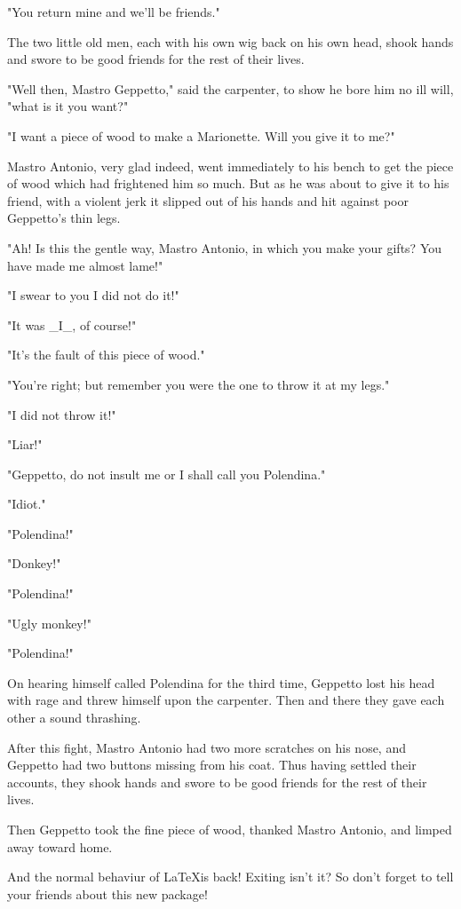 \documentclass[12pt,twoside]{article}
\begin{document}
{  "You return mine and we'll be friends."

  The two little old men, each with his own wig back on
  his own head, shook hands and swore to be good friends
  for the rest of their lives.

  "Well then, Mastro Geppetto," said the carpenter, to
  show he bore him no ill will, "what is it you want?"

  "I want a piece of wood to make a Marionette.  Will you give it to
  me?"

  Mastro Antonio, very glad indeed, went immediately
  to his bench to get the piece of wood which had frightened
  him so much.  But as he was about to give it to his friend,
  with a violent jerk it slipped out of his hands and hit
  against poor Geppetto's thin legs.

  "Ah!  Is this the gentle way, Mastro Antonio, in which
  you make your gifts?  You have made me almost lame!"

  "I swear to you I did not do it!"

  "It was \_I\_, of course!"

  "It's the fault of this piece of wood."

  "You're right; but remember you were the one to throw it at my legs."

  "I did not throw it!"

  "Liar!"

  "Geppetto, do not insult me or I shall call you Polendina."

  "Idiot."

  "Polendina!"

  "Donkey!"

  "Polendina!"

  "Ugly monkey!"

  "Polendina!"

  On hearing himself called Polendina for the third time,
  Geppetto lost his head with rage and threw himself upon
  the carpenter.  Then and there they gave each other a
  sound thrashing.

  After this fight, Mastro Antonio had two more scratches
  on his nose, and Geppetto had two buttons missing from
  his coat.  Thus having settled their accounts, they shook
  hands and swore to be good friends for the rest of their lives.

  Then Geppetto took the fine piece of wood,
  thanked Mastro Antonio, and limped away toward home.
}
\endrotboxpages

And the normal behaviur of \LaTeX is back!
Exiting isn't it? So don't forget to tell your friends about this new
package!
\end{document}
